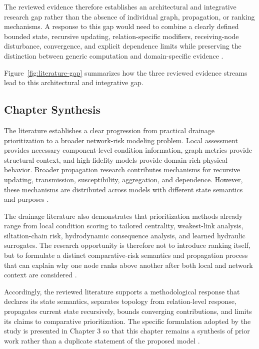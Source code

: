 The reviewed evidence therefore establishes an architectural and
integrative research gap rather than the absence of individual graph,
propagation, or ranking mechanisms. A response to this gap would need to
combine a clearly defined bounded state, recursive updating,
relation-specific modifiers, receiving-node disturbance, convergence,
and explicit dependence limits while preserving the distinction between
generic computation and domain-specific evidence
\citep{kempe2003,buldyrev2010,sheyner2002,dastgir2023,zhang2025}.

Figure~\ref{fig:literature-gap} summarizes how the three reviewed
evidence streams lead to this architectural and integrative gap.



\subsection{Chapter Synthesis}\label{chapter-synthesis}

The literature establishes a clear progression from practical drainage
prioritization to a broader network-risk modeling problem. Local
assessment provides necessary component-level condition information,
graph metrics provide structural context, and high-fidelity models
provide domain-rich physical behavior. Broader propagation research
contributes mechanisms for recursive updating, transmission,
susceptibility, aggregation, and dependence. However, these mechanisms
are distributed across models with different state semantics and
purposes \citep{kempe2003,kermack1927,buldyrev2010,sheyner2002,
kavallieratos2021,petrone2018}.

The drainage literature also demonstrates that prioritization methods
already range from local condition scoring to tailored centrality,
weakest-link analysis, siltation-chain risk, hydrodynamic consequence
analysis, and learned hydraulic surrogates. The research opportunity is
therefore not to introduce ranking itself, but to formulate a distinct
comparative-risk semantics and propagation process that can explain why
one node ranks above another after both local and network context are
considered \citep{iqbal2021,simone2022,dastgir2023,meijer2023,
zhang2024}.

Accordingly, the reviewed literature supports a methodological response
that declares its state semantics, separates topology from relation-level
response, propagates current state recursively, bounds converging
contributions, and limits its claims to comparative prioritization. The
specific formulation adopted by the study is presented in Chapter 3 so
that this chapter remains a synthesis of prior work rather than a
duplicate statement of the proposed model \citep{kempe2003,buldyrev2010,
munoz2017,dastgir2023,zhang2025}.
